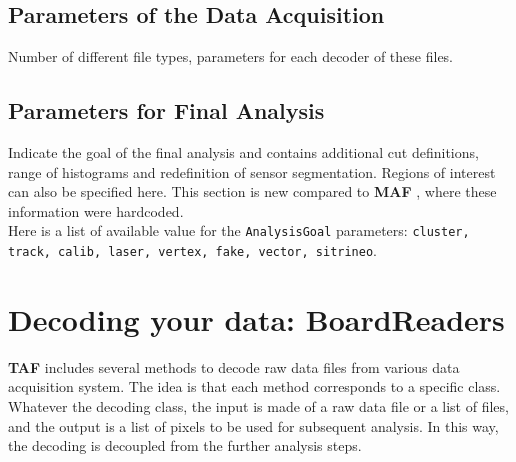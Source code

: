 \documentclass[a4paper, 12pt, twoside]{article}
\newcommand{\TAF}{{\bf TAF }}
\newcommand{\MAF}{{\bf MAF }}
\begin{document}
\subsection{Parameters of the Data Acquisition}
Number of different file types, parameters for each decoder of these files.

\subsection{Parameters for Final Analysis}
\label{subsec:paramFinalAnalysis}
Indicate the goal of the final analysis and contains additional cut definitions, range of histograms and redefinition of sensor segmentation. Regions of interest can also be specified here. This section is new compared to \MAF, where these information were hardcoded.\\
Here is a list of available value for the {\tt AnalysisGoal} parameters: {\tt cluster, track, calib, laser, vertex, fake, vector, sitrineo}.



\vspace{2cm}

\section{Decoding your data: BoardReaders}
\label{secReader}

\TAF  includes several methods to decode raw data files from various data acquisition system. The idea is that each method corresponds to a specific class. Whatever the decoding class, the input is made of a raw data file or a list of files, and the output is a list of pixels to be used for subsequent analysis. In this way, the decoding is decoupled from the further analysis steps.\\
\end{document}
